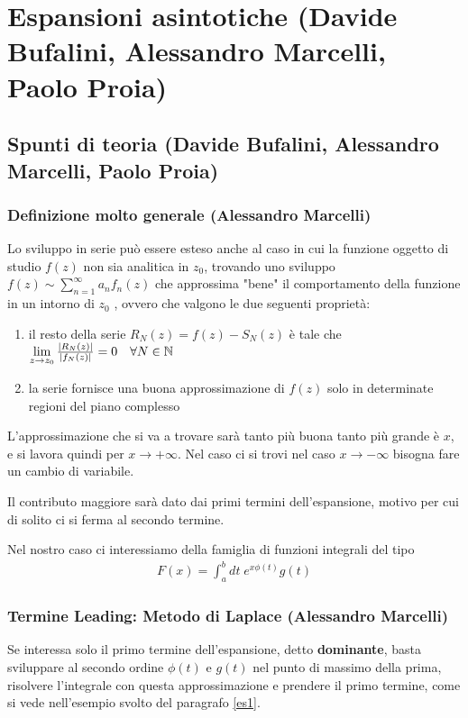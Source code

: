 \section{Espansioni asintotiche (Davide Bufalini, Alessandro Marcelli, Paolo Proia)}

\subsection{Spunti di teoria (Davide Bufalini, Alessandro Marcelli, Paolo Proia)}

\subsubsection{Definizione molto generale (Alessandro Marcelli)}

Lo sviluppo in serie può essere esteso anche al caso in cui la funzione oggetto di studio $f(z)$ non sia analitica in $z_0$, trovando uno sviluppo $f(z) \sim \sum_{n=1}^{\infty} a_n f_n(z)$ che approssima "bene" il comportamento della funzione in un intorno di $z_0$ \cite{MMF}, ovvero che valgono le due seguenti proprietà:
\begin{enumerate}
	\item il resto della serie $R_N(z) = f(z) - S_N(z)$ è tale che $\underset{z \rightarrow z_0}{\lim} \, \frac{|R_N(z)|}{|f_N(z)|} = 0 \quad \forall N\in \mathbb{N}$
	\item la serie fornisce una buona approssimazione di $f(z)$ solo in determinate regioni del piano complesso
\end{enumerate}
L'approssimazione che si va a trovare sarà tanto più buona tanto più grande è $x$, e si lavora quindi per $x \to + \infty$. Nel caso ci si trovi nel caso $x \to -\infty$ bisogna fare un cambio di variabile.

Il contributo maggiore sarà dato dai primi termini dell'espansione, motivo per cui di solito ci si ferma al secondo termine.

Nel nostro caso ci interessiamo della famiglia di funzioni integrali del tipo
\begin{align}
	F(x) = \int_{a}^{b} dt \; e^{x\phi(t)}g(t) \label{lol0}
\end{align}

\subsubsection{Termine Leading: Metodo di Laplace (Alessandro Marcelli)}

Se interessa solo il primo termine dell'espansione, detto \textbf{dominante}, basta sviluppare al secondo ordine $\phi(t)$ e $g(t)$ nel punto di massimo della prima, risolvere l'integrale con questa approssimazione e prendere il primo termine, come si vede nell'esempio svolto del paragrafo \ref{es1}.

